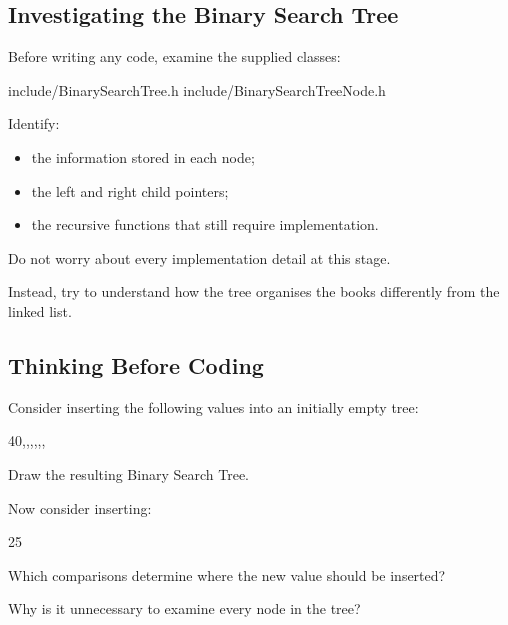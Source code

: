 \documentclass{csc2059practical}
\begin{document}

\subsection{Investigating the Binary Search Tree}

Before writing any code, examine the supplied classes:

\begin{terminal}
include/BinarySearchTree.h
include/BinarySearchTreeNode.h
\end{terminal}

Identify:

\begin{itemize}
    \item the information stored in each node;
    \item the left and right child pointers;
    \item the recursive functions that still require implementation.
\end{itemize}

Do not worry about every implementation detail at this stage.

Instead, try to understand how the tree organises the books differently from
the linked list.


\subsection{Thinking Before Coding}

Consider inserting the following values into an initially empty tree:

\begin{center}
40,,,,,,
\end{center}

Draw the resulting Binary Search Tree.

Now consider inserting:

\begin{center}
25
\end{center}

\begin{reflectionbox}
Which comparisons determine where the new value should be inserted?

Why is it unnecessary to examine every node in the tree?
\end{reflectionbox}
\end{document}
